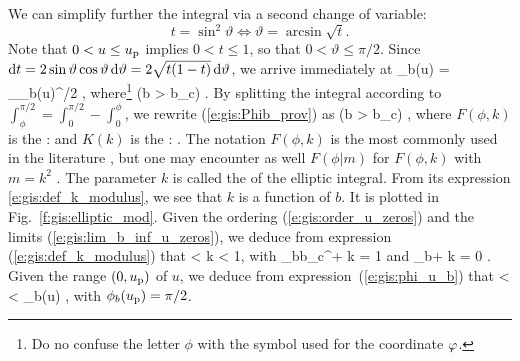 We can simplify further the integral via a second change of variable:
\[
    t = \sin^2 \vartheta \iff \vartheta = \arcsin\sqrt{t} .
\]
Note that $0<u\leq u_{\rm p}$ implies $0 < t \leq 1$, so that $0<\vartheta\leq \pi/2$.
Since $\mathrm{d} t = 2\sin\vartheta\cos\vartheta \, \mathrm{d}\vartheta = 2\sqrt{t(1-t)}\, \mathrm{d}\vartheta$,
we arrive immediately at
\be \label{e:gis:Phib_prov}
    \Phi_b(u) =   \int_{\phi_b(u)}^{\pi/2}
      ,
\ee
where\footnote{Do no confuse the letter $\phi$ with the symbol used
for the coordinate $\varphi$.}
\be \label{e:gis:phi_u_b}
     \qquad (b > b_{\rm c}) .
\ee
By splitting the integral according to $\int_\phi^{\pi/2} = \int_0^{\pi/2} - \int_0^\phi$,
we rewrite (\ref{e:gis:Phib_prov}) as
\be \label{e:gis:Phib_elliptic_int}
     \qquad (b > b_{\rm c}) ,
\ee
where $F(\phi, k)$ is the
 \cite{ByrdF71,GradsRGTJ115,AbramS72}:
\be \label{e:gis:def_incompl_elliptic_int}
\ee
and $K(k)$ is the :
\be \label{e:gis:def_K_complete}
    .
\ee
The notation $F(\phi, k)$ is the most commonly used
in the literature \cite{ByrdF71,GradsRGTJ115}, but one may encounter as well
$F(\phi|m)$ for $F(\phi, k)$ with $m=k^2$ \cite{AbramS72}.
The parameter $k$ is called the  of
the elliptic integral. From its expression \eqref{e:gis:def_k_modulus}, we
see that $k$ is a function of $b$. It is plotted in Fig.~\ref{f:gis:elliptic_mod}.
Given the ordering (\ref{e:gis:order_u_zeros}) and the limits (\ref{e:gis:lim_b_inf_u_zeros}),
we deduce from expression (\ref{e:gis:def_k_modulus}) that
 < k < 1,
\ee
with
\be \label{e:gis:k_limits_b_gt_bc}
    \lim_{b\to b_{\rm c}^+} k = 1 \qquad\mbox{and}\qquad
    \lim_{b\to +\infty} k = 0 .
\ee
Given the range $(0, u_{\rm p})$ of $u$, we deduce from expression~(\ref{e:gis:phi_u_b})
that
 <  \arcsin {}
     < \phi_b(u) \leq {} ,
\ee
with $\phi_b(u_{\rm p}) = \pi/2$.

